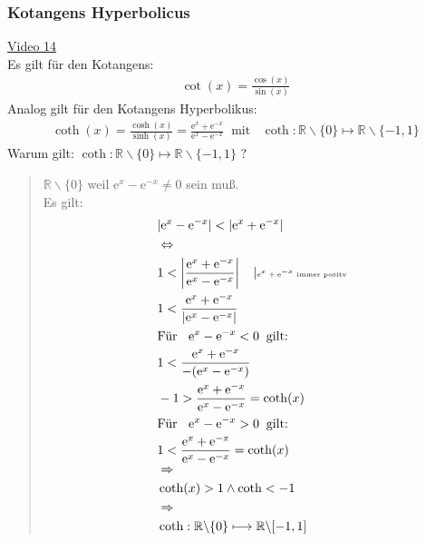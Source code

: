 \subsubsection{Kotangens Hyperbolicus}
\href{https://youtu.be/4mRuIkIRMCY}{Video 14}\\
Es gilt für den Kotangens:\\
\begin{align*}
\cot(x)=\frac{\cos(x)}{\sin(x)}
\end{align*}
Analog gilt für den Kotangens Hyperbolikus:\\
\begin{align*}
\coth(x)=\frac{\cosh(x)}{\sinh(x)}=\frac{\mathrm{e}^x+\mathrm{e}^{-x}}{\mathrm{e}^x-\mathrm{e}^{-x}}\;\;\text{mit }\;\;\coth:\mathbb{R}\backslash\{0\}\longmapsto \mathbb{R}\backslash \{-1,1\}
\end{align*} 
Warum gilt: $\coth:\mathbb{R}\backslash\{0\}\longmapsto \mathbb{R}\backslash \{-1,1\}  $ ?\\
\begin{quote}
	\textbullet \;\;$ \mathbb{R} \backslash\{0\}$ weil $ \mathrm{e}^x-\mathrm{e}^{-x}\neq 0 $ sein muß.\\
	\newpage
	\noindent
	\textbullet \;\; Es gilt:\\
	\begin{align*}
	&|\mathrm{e}^x-\mathrm{e}^{-x}|<|\mathrm{e}^x +\mathrm{e}^{-x}|\\
	&\Leftrightarrow\\
	&1<\bigg|\frac{\mathrm{e}^x +\mathrm{e}^{-x}}{\mathrm{e}^x-\mathrm{e}^{-x}}\bigg|\;\;\;\;|\text{\tiny $\mathrm{e}^x +\mathrm{e}^{-x}  $  immer positv }\\
	&1<\frac{\mathrm{e}^x +\mathrm{e}^{-x}}{|\mathrm{e}^x-\mathrm{e}^{-x}|}\\
	&\text{Für }\;\;\mathrm{e}^x-\mathrm{e}^{-x}<0\;\;\text{gilt: }\\
	&1<\frac{\mathrm{e}^x+\mathrm{e}^{-x}}{-(\mathrm{e}^x-\mathrm{e}^{-x})}\\
	&-1>\frac{\mathrm{e}^x+\mathrm{e}^{-x}}{\mathrm{e}^x-\mathrm{e}^{-x}}=\coth(x)\\
	&\text{Für }\;\;\mathrm{e}^x-\mathrm{e}^{-x}>0\;\;\text{gilt: }\\
	&1<\frac{\mathrm{e}^x+\mathrm{e}^{-x}}{\mathrm{e}^x-\mathrm{e}^{-x}}=\coth(x)\\
	&\Rightarrow\\
	&\coth(x)>1 \wedge \coth<-1\\
	&\Rightarrow\\
	&\coth:\mathbb{R}\backslash\{0\}\longmapsto \mathbb{R}\backslash [-1,1 ]
	\end{align*}
\end{quote}
